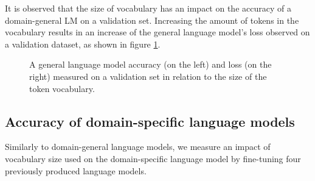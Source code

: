 It is observed that the size of vocabulary has an impact on the accuracy of a domain-general LM on a validation set. Increasing the amount of tokens in the vocabulary results in an increase of the general language model's loss observed on a validation dataset, as shown in figure \ref{vocab:glmplot}.

\begin{figure}[h]
    \centering
    \caption{A general language model accuracy (on the left) and loss (on the right) measured on a validation  set in relation to the size of the token vocabulary.}

\label{vocab:glmplot}
\end{figure}

\subsection{Accuracy of domain-specific language models}
\label{vocab:domain-specific-results}

Similarly to domain-general language models, we measure an impact of vocabulary size used on the domain-specific language model by fine-tuning four previously produced language models.

